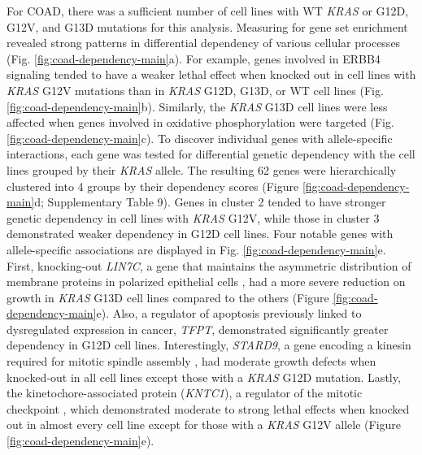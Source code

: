 \documentclass[english, 10pt, letterpaper]{article}
\newcommand{\KRAS}{\emph{KRAS}}
\begin{document}
For COAD, there was a sufficient number of cell lines with WT \KRAS{} or G12D, G12V, and G13D mutations for this analysis.
Measuring for gene set enrichment revealed strong patterns in differential dependency of various cellular processes (Fig. \ref{fig:coad-dependency-main}a).
For example, genes involved in ERBB4 signaling tended to have a weaker lethal effect when knocked out in cell lines with \KRAS{} G12V mutations than in \KRAS{} G12D, G13D, or WT cell lines (Fig. \ref{fig:coad-dependency-main}b).
Similarly, the \KRAS{} G13D cell lines were less affected when genes involved in oxidative phosphorylation were targeted (Fig. \ref{fig:coad-dependency-main}c).
To discover individual genes with allele-specific interactions, each gene was tested for differential genetic dependency with the cell lines grouped by their \KRAS{} allele.
The resulting 62 genes were hierarchically clustered into 4 groups by their dependency scores (Figure \ref{fig:coad-dependency-main}d; Supplementary Table 9).
Genes in cluster 2 tended to have stronger genetic dependency in cell lines with \KRAS{} G12V, while those in cluster 3 demonstrated weaker dependency in G12D cell lines.
Four notable genes with allele-specific associations are displayed in Fig. \ref{fig:coad-dependency-main}e.
First, knocking-out \emph{LIN7C}, a gene that maintains the asymmetric distribution of membrane proteins in polarized epithelial cells \cite{Monastyrskaya2013MiR-199a-5pSyndrome}, had a more severe reduction on growth in \KRAS{} G13D cell lines compared to the others (Figure \ref{fig:coad-dependency-main}e).
Also, a regulator of apoptosis previously linked to dysregulated expression in cancer, \emph{TFPT}, demonstrated significantly greater dependency in G12D cell lines.
Interestingly, \emph{STARD9}, a gene encoding a kinesin required for mitotic spindle assembly \cite{Torres2011TheAssembly}, had moderate growth defects when knocked-out in all cell lines except those with a \KRAS{} G12D mutation.
Lastly, the kinetochore-associated protein (\emph{KNTC1}), a regulator of the mitotic checkpoint \cite{Chan2000HumanKinetochores., Scaerou2001TheKinetochore., Kops2005ZW10Kinetochore.}, which demonstrated moderate to strong lethal effects when knocked out in almost every cell line except for those with a \KRAS{} G12V allele (Figure \ref{fig:coad-dependency-main}e).
\end{document}
